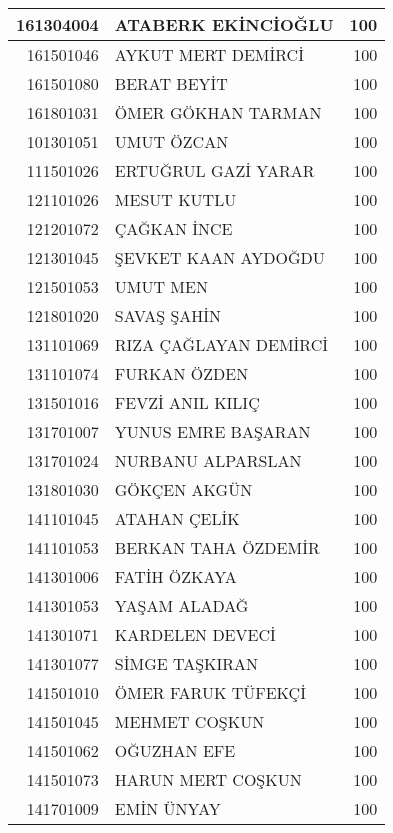 \documentclass[12pt]{article}
\begin{document}
\begin{longtable}{||r||l||r||}
    \midrule
    161304004 & ATABERK EKİNCİOĞLU & 100 \\
    \midrule
    161501046 & AYKUT MERT DEMİRCİ & 100 \\
    \midrule
    161501080 & BERAT BEYİT & 100 \\
    \midrule
    161801031 & ÖMER GÖKHAN TARMAN & 100 \\
    \midrule
    101301051 & UMUT ÖZCAN & 100 \\
    \midrule
    111501026 & ERTUĞRUL GAZİ YARAR & 100 \\
    \midrule
    121101026 & MESUT KUTLU & 100 \\
    \midrule
    121201072 & ÇAĞKAN İNCE & 100 \\
    \midrule
    121301045 & ŞEVKET KAAN AYDOĞDU & 100 \\
    \midrule
    121501053 & UMUT MEN & 100 \\
    \midrule
    121801020 & SAVAŞ ŞAHİN & 100 \\
    \midrule
    131101069 & RIZA ÇAĞLAYAN DEMİRCİ & 100 \\
    \midrule
    131101074 & FURKAN ÖZDEN & 100 \\
    \midrule
    131501016 & FEVZİ ANIL KILIÇ & 100 \\
    \midrule
    131701007 & YUNUS EMRE BAŞARAN & 100 \\
    \midrule
    131701024 & NURBANU ALPARSLAN & 100 \\
    \midrule
    131801030 & GÖKÇEN AKGÜN & 100 \\
    \midrule
    141101045 & ATAHAN ÇELİK & 100 \\
    \midrule
    141101053 & BERKAN TAHA ÖZDEMİR & 100 \\
    \midrule
    141301006 & FATİH ÖZKAYA & 100 \\
    \midrule
    141301053 & YAŞAM ALADAĞ & 100 \\
    \midrule
    141301071 & KARDELEN DEVECİ & 100 \\
    \midrule
    141301077 & SİMGE TAŞKIRAN & 100 \\
    \midrule
    141501010 & ÖMER FARUK TÜFEKÇİ & 100 \\
    \midrule
    141501045 & MEHMET COŞKUN & 100 \\
    \midrule
    141501062 & OĞUZHAN EFE & 100 \\
    \midrule
    141501073 & HARUN MERT COŞKUN & 100 \\
    \midrule
    141701009 & EMİN ÜNYAY & 100 \\

\end{longtable}
\end{document}
